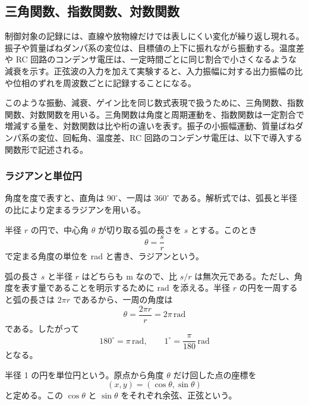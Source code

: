 \subsection{三角関数、指数関数、対数関数}

制御対象の記録には、直線や放物線だけでは表しにくい変化が繰り返し現れる。振子や質量ばねダンパ系の変位は、目標値の上下に振れながら振動する。温度差や RC 回路のコンデンサ電圧は、一定時間ごとに同じ割合で小さくなるような減衰を示す。正弦波の入力を加えて実験すると、入力振幅に対する出力振幅の比や位相のずれを周波数ごとに記録することになる。

このような振動、減衰、ゲイン比を同じ数式表現で扱うために、三角関数、指数関数、対数関数を用いる。三角関数は角度と周期運動を、指数関数は一定割合で増減する量を、対数関数は比や桁の違いを表す。振子の小振幅運動、質量ばねダンパ系の変位、回転角、温度差、RC 回路のコンデンサ電圧は、以下で導入する関数形で記述される。

\subsubsection{ラジアンと単位円}

角度を度で表すと、直角は $90^\circ$、一周は $360^\circ$ である。解析式では、弧長と半径の比により定まるラジアンを用いる。

\begin{definition}[ラジアン]
半径 $r$ の円で、中心角 $\theta$ が切り取る弧の長さを $s$ とする。このとき
\begin{equation}
  \theta=\frac{s}{r}
\end{equation}
で定まる角度の単位を rad と書き、ラジアンという。
\end{definition}

弧の長さ $s$ と半径 $r$ はどちらも m なので、比 $s/r$ は無次元である。ただし、角度を表す量であることを明示するために $\mathrm{rad}$ を添える。半径 $r$ の円を一周すると弧の長さは $2\pi r$ であるから、一周の角度は
\begin{equation}
  \theta=\frac{2\pi r}{r}=2\pi\,\mathrm{rad}
\end{equation}
である。したがって
\begin{equation}
  180^\circ=\pi\,\mathrm{rad},
  \qquad
  1^\circ=\frac{\pi}{180}\,\mathrm{rad}
\end{equation}
となる。

\begin{definition}[単位円による三角関数]
半径 1 の円を単位円という。原点から角度 $\theta$ だけ回した点の座標を
\begin{equation}
  (x,y)=(\cos\theta,\sin\theta)
\end{equation}
と定める。この $\cos\theta$ と $\sin\theta$ をそれぞれ余弦、正弦という。
\end{definition}

